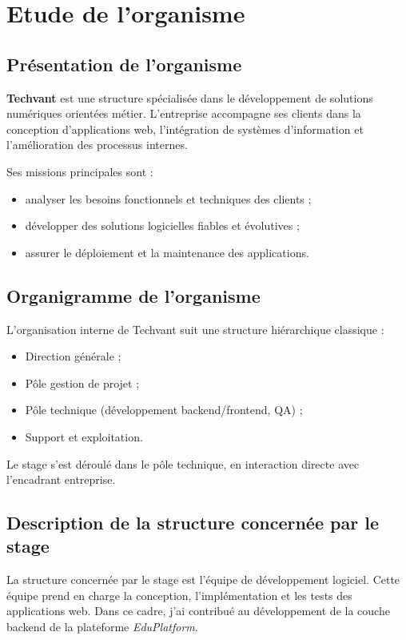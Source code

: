 \chapter{Etude de l'organisme}

\section{Présentation de l'organisme}
\textbf{Techvant} est une structure spécialisée dans le développement de solutions numériques orientées métier. L'entreprise accompagne ses clients dans la conception d'applications web, l'intégration de systèmes d'information et l'amélioration des processus internes.

Ses missions principales sont :
\begin{itemize}
	\item analyser les besoins fonctionnels et techniques des clients ;
	\item développer des solutions logicielles fiables et évolutives ;
	\item assurer le déploiement et la maintenance des applications.
\end{itemize}

\section{Organigramme de l'organisme}
L'organisation interne de Techvant suit une structure hiérarchique classique :
\begin{itemize}
	\item Direction générale ;
	\item Pôle gestion de projet ;
	\item Pôle technique (développement backend/frontend, QA) ;
	\item Support et exploitation.
\end{itemize}

Le stage s'est déroulé dans le pôle technique, en interaction directe avec l'encadrant entreprise.

\section{Description de la structure concernée par le stage}
La structure concernée par le stage est l'équipe de développement logiciel. Cette équipe prend en charge la conception, l'implémentation et les tests des applications web. Dans ce cadre, j'ai contribué au développement de la couche backend de la plateforme \textit{EduPlatform}.
